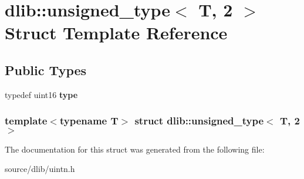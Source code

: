 \hypertarget{structdlib_1_1unsigned__type_3_01T_00_012_01_4}{
\section{dlib::unsigned\_\-type$<$ T, 2 $>$ Struct Template Reference}
\label{structdlib_1_1unsigned__type_3_01T_00_012_01_4}
}
\subsection*{Public Types}
\begin{DoxyCompactItemize}
\item 
\hypertarget{structdlib_1_1unsigned__type_3_01T_00_012_01_4_a0a1193eee5098662c1b0822cf9891710}{
typedef uint16 {\bfseries type}}
\label{structdlib_1_1unsigned__type_3_01T_00_012_01_4_a0a1193eee5098662c1b0822cf9891710}

\end{DoxyCompactItemize}
\subsubsection*{template$<$typename T$>$ struct dlib::unsigned\_\-type$<$ T, 2 $>$}



The documentation for this struct was generated from the following file:\begin{DoxyCompactItemize}
\item 
source/dlib/uintn.h\end{DoxyCompactItemize}
